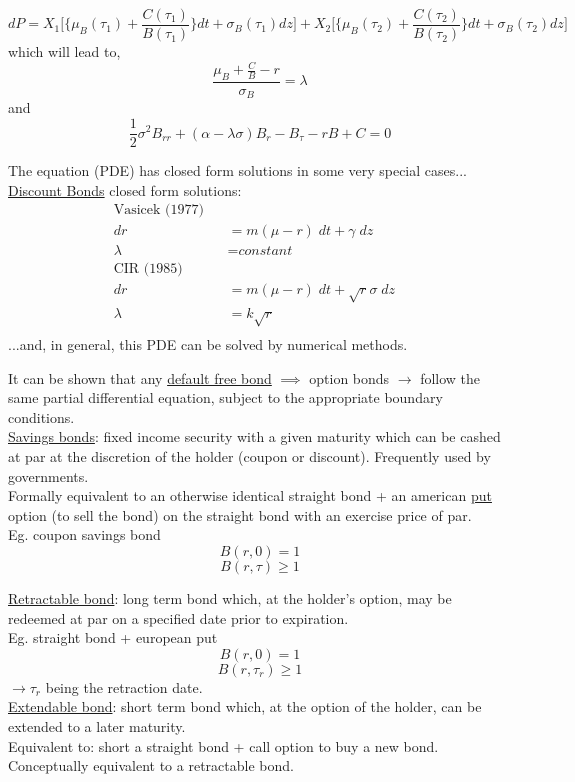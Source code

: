 \documentclass[
14pt,notheorems,hyperref={pdfauthor=whatever}
]{beamer}
\begin{document}
\begin{frame}
\[ dP = X_1\bigg[\bigg\{\mu_B(\tau_1)+\frac{C(\tau_1)}{B(\tau_1)}\bigg\}dt + \sigma_B(\tau_1)dz\bigg]+X_2\bigg[\bigg\{\mu_B(\tau_2)+\frac{C(\tau_2)}{B(\tau_2)}\bigg\}dt + \sigma_B(\tau_2)dz\bigg]\]
\hfill\break
which will lead to,
\[ \frac{\mu_B+\frac{C}{B}-r}{\sigma_B} = \lambda \]
and
\[ \frac{1}{2}\sigma^2 B_{rr} + (\alpha - \lambda\sigma)B_r - B_\tau -rB + C = 0\]
\end{frame}

\begin{frame}
The equation (PDE) has closed form solutions in some very special cases...\\
\hfill\break
\underline{Discount Bonds} closed form solutions:
\begin{align*}
    \text{Vasicek (1977) }\;\;&\\
    dr &= m(\mu-r)\;dt+\gamma\;dz\\
    \lambda &= \textit{constant}
    &\\
    \text{CIR (1985) }\;\;&\\
    dr &= m(\mu-r)\;dt+\sqrt{r}\sigma\;dz\\
    \lambda &= k\sqrt{r}\\
\end{align*}
...and, in general, this PDE can be solved by numerical methods.
\end{frame}

\begin{frame}
It can be shown that any \underline{default free bond} $\implies$ option bonds $\rightarrow$ follow the same partial differential equation, subject to the appropriate boundary conditions.\\
\hfill\break
\underline{Savings bonds}: fixed income security with a given maturity which can be cashed at par at the discretion of the holder (coupon or discount). Frequently used by governments.\\
Formally equivalent to an otherwise identical straight bond + an american \underline{put} option (to sell the bond) on the straight bond with an exercise price of par.\\
\hfill\break
Eg. coupon savings bond
\[ B(r,0) = 1 \]
\[ B(r,\tau) \geq 1 \]
\end{frame}

\begin{frame}
\underline{Retractable bond}: long term bond which, at the holder's option, may be redeemed at par on a specified date prior to expiration.\\
\hfill\break
Eg. straight bond + european put
\[ B(r,0) = 1 \]
\[ B(r,\tau_r) \geq 1 \]
$\longrightarrow \tau_r$ being the retraction date.\\
\hfill\break
\underline{Extendable bond}: short term bond which, at the option of the holder, can be extended to a later maturity.\\
Equivalent to: short a straight bond + call option to buy a new bond.\\
\hfill\break
Conceptually equivalent to a retractable bond.
\end{frame}
\end{document}
